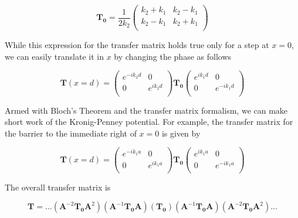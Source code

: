 \begin{equation}
\mathbf{T_{0}} = \frac{1}{2 k_{2}}
	\begin{pmatrix}
		k_{2} + k_{1} & k_{2} - k_{1} \\
		k_{2} - k_{1} & k_{2} + k_{1} \\
	\end{pmatrix}
\end{equation}


While this expression for the transfer matrix holds true only for a step at $x=0$, we can easily translate it in $x$ by changing the phase as follows

\begin{equation}
\mathbf{T}(x = d) = 
	\begin{pmatrix}
		e^{-i k_{2} d} & 0 \\
		0 & e^{i k_{2} d}  \\
	\end{pmatrix}
	\mathbf{T_{0}}
	\begin{pmatrix}
		e^{i k_{1} d} & 0 \\
		0 & e^{-i k_{1} d}  \\
	\end{pmatrix}
\end{equation}

Armed with Bloch's Theorem and the transfer matrix formalism, we can make short work of the Kronig-Penney potential. For example, the transfer matrix for the barrier to the immediate right of $x = 0$ is given by

\begin{equation}
\mathbf{T}(x = d) = 
	\begin{pmatrix}
		e^{-i k_{1} a} & 0 \\
		0 & e^{i k_{1} a}  \\
	\end{pmatrix}
	\mathbf{T_{0}}
	\begin{pmatrix}
		e^{i k_{1} a} & 0 \\
		0 & e^{-i k_{1} a}  \\
	\end{pmatrix}
\end{equation}

The overall transfer matrix is

\begin{equation}
\mathbf{T} = ...(\mathbf{A}^{-2}\mathbf{T_{0}} \mathbf{A}^{2})(\mathbf{A}^{-1}\mathbf{T_{0}} \mathbf{A})(\mathbf{T_{0}})(\mathbf{A}^{-1}\mathbf{T_{0}} \mathbf{A})(\mathbf{A}^{-2}\mathbf{T_{0}} \mathbf{A}^{2})...
\end{equation}

